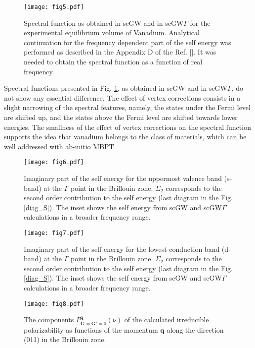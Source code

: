 \documentclass[aps,prb,floatfix,epsfig,twocolumn,preprintnumbers]{revtex4}
\begin{document}
\begin{figure}[b]
\centering
\texttt{[image: fig5.pdf]}
\caption{Spectral function as obtained in scGW and in scGW$\Gamma$ for the experimental equilibrium volume of Vanadium. Analytical continuation for the frequency dependent part of the self energy was performed as described in the Appendix D of the Ref. []. It was needed to obtain the spectral function as a function of real frequency.} \label{dos}
\end{figure}

Spectral functions presented in Fig. \ref{dos}, as obtained in scGW and in scGW$\Gamma$, do not show any essential difference. The effect of vertex corrections consists in a slight narrowing of the spectral features, namely, the states under the Fermi level are shifted up, and the states above the Fermi level are shifted towards lower energies. The smallness of the effect of vertex corrections on the spectral function supports the idea that vanadium belongs to the class of materials, which can be well addressed with ab-initio MBPT.

\begin{figure}[t]
\centering
\texttt{[image: fig6.pdf]}
\caption{Imaginary part of the self energy for the uppermost valence band (s-band) at the $\Gamma$ point in the Brillouin zone. $\Sigma_{2}$ corresponds to the second order contribution to the self energy (last diagram in the Fig. \ref{diag_S}). The inset shows the self energy from scGW and scGW$\Gamma$ calculations in a broader frequency range.} \label{sigma_s}
\end{figure}


\begin{figure}[b]
\centering
\texttt{[image: fig7.pdf]}
\caption{Imaginary part of the self energy for the lowest conduction band (d-band) at the $\Gamma$ point in the Brillouin zone. $\Sigma_{2}$ corresponds to the second order contribution to the self energy (last diagram in the Fig. \ref{diag_S}). The inset shows the self energy from scGW and scGW$\Gamma$ calculations in a broader frequency range.} \label{sigma_d}
\end{figure}




\begin{figure}[t]
\centering
\texttt{[image: fig8.pdf]}
\caption{The components $P^{\mathbf{q}}_{\mathbf{G}=\mathbf{G}'=0}(\nu)$ of the calculated irreducible polarizability as functions of the momentum $\mathbf{q}$ along the direction (011) in the Brillouin zone.} \label{p_pw}
\end{figure}
\end{document}
